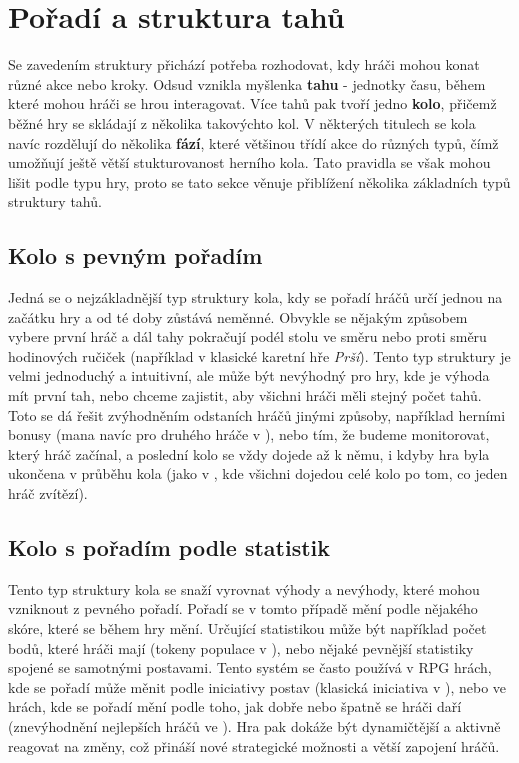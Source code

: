 
\section{Pořadí a struktura tahů}
\label{sec:turns}

Se zavedením struktury přichází potřeba rozhodovat, kdy hráči mohou konat různé akce nebo kroky. Odsud vznikla myšlenka \textbf{tahu} - jednotky času, během které mohou hráči se hrou interagovat. Více tahů pak tvoří jedno \textbf{kolo}, přičemž běžné hry se skládají z několika takovýchto kol. V některých titulech se kola navíc rozdělují do několika \textbf{fází}, které většinou třídí akce do různých typů, čímž umožňují ještě větší stukturovanost herního kola. Tato pravidla se však mohou lišit podle typu hry, proto se tato sekce věnuje přiblížení několika základních typů struktury tahů.

\subsection{Kolo s pevným pořadím}
\label{subsec:turns_fixed_order}

Jedná se o nejzákladnější typ struktury kola, kdy se pořadí hráčů určí jednou na začátku hry a od té doby zůstává neměnné. Obvykle se nějakým způsobem vybere první hráč a dál tahy pokračují podél stolu ve směru nebo proti směru hodinových ručiček (například v klasické karetní hře \textit{Prší}). Tento typ struktury je velmi jednoduchý a intuitivní, ale může být nevýhodný pro hry, kde je výhoda mít první tah, nebo chceme zajistit, aby všichni hráči měli stejný počet tahů. Toto se dá řešit zvýhodněním odstaních hráčů jinými způsoby, například herními bonusy (mana navíc pro druhého hráče v ), nebo tím, že budeme monitorovat, který hráč začínal, a poslední kolo se vždy dojede až k němu, i kdyby hra byla ukončena v průběhu kola (jako v , kde všichni dojedou celé kolo po tom, co jeden hráč zvítězí).

\subsection{Kolo s pořadím podle statistik}
\label{subsec:turns_stat_order}

Tento typ struktury kola se snaží vyrovnat výhody a nevýhody, které mohou vzniknout z pevného pořadí. Pořadí se v tomto případě mění podle nějakého skóre, které se během hry mění. Určující statistikou může být například počet bodů, které hráči mají (tokeny populace v ), nebo nějaké pevnější statistiky spojené se samotnými postavami. Tento systém se často používá v RPG hrách, kde se pořadí může měnit podle iniciativy postav (klasická iniciativa v ), nebo ve hrách, kde se pořadí mění podle toho, jak dobře nebo špatně se hráči daří (znevýhodnění nejlepších hráčů ve ). Hra pak dokáže být dynamičtější a aktivně reagovat na změny, což přináší nové strategické možnosti a větší zapojení hráčů.


